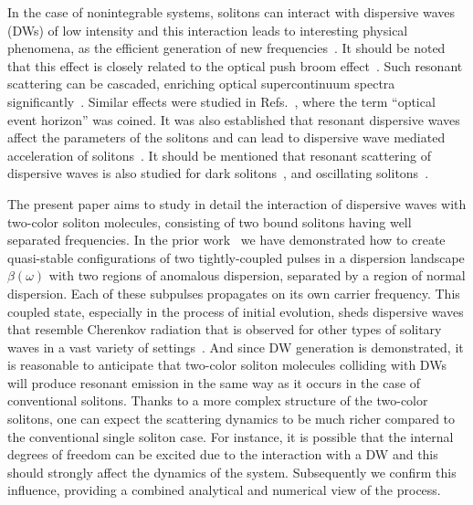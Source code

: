 \documentclass[aps, pra, twocolumn, superscriptaddress, final]{revtex4}
\begin{document}
In the case of nonintegrable systems, solitons can interact with dispersive
waves (DWs) of low intensity and this interaction leads to interesting physical
phenomena, as the efficient generation of new frequencies~\cite{Yulin:04,
PhysRevE.72.016619, Efimov:04, PhysRevLett.95.213902, Efimov:06}.
It should be noted that this effect is closely related to the optical push
broom effect~\cite{deSterke:92}.
Such resonant scattering can be cascaded, enriching optical
supercontinuum spectra significantly~\cite{Gorbach_NatPhoton}.
Similar effects
were studied in Refs.~\cite{PhysRevLett.110.233901,  Demircan_SciRep,
Philbin_Science}, where the term ``optical event horizon'' was coined. It was
also established that resonant dispersive waves affect the parameters of the
solitons and can lead to dispersive wave mediated acceleration of
solitons~\cite{PhysRevE.72.016619, PhysRevLett.106.163901,
PhysRevLett.110.233901, Yulin:13, Demircan:14,  Wang:15, PhysRevA.98.023833}.
It should be mentioned that resonant scattering of dispersive waves is also
studied for dark solitons~\cite{Oreshnikov:15, Marest:18,  Deng:18,
PhysRevA.103.023505}, and oscillating solitons~\cite{Kodama:94,
Conforti_SciRep, Driben:15, PhysRevLett.115.223902, PhysRevLett.116.183901,
PhysRevA.96.013809}.

The present paper aims to study in detail the interaction of dispersive waves
with two-color soliton molecules, consisting of two bound solitons having well separated
frequencies.
%
In the prior work~\cite{PhysRevLett.123.243905} we have demonstrated how to
create quasi-stable configurations of two tightly-coupled pulses in a
dispersion landscape $\beta(\omega)$ with two regions of anomalous dispersion,
separated by a region of normal dispersion. Each of these subpulses propagates
on its own carrier frequency.
%
This coupled state, especially in the process of initial
evolution, sheds dispersive waves that resemble Cherenkov radiation that is
observed for other types of solitary waves in a vast variety of
settings~\cite{akhmediev1995cherenkov, afanasjev1996effect, Driben:15,
Conforti_SciRep, PhysRevLett.115.223902, PhysRevA.96.013809}. And since DW
generation is demonstrated, it is reasonable to anticipate that two-color
soliton molecules colliding with DWs will produce resonant emission in the same
way as it occurs in the case of conventional solitons.
Thanks to a more complex structure of the two-color solitons, one can expect
the scattering dynamics to be much richer compared to the conventional single
soliton case. For instance, it is possible that the internal degrees of freedom
can be excited due to the interaction with a DW and this should
strongly affect the dynamics of the system.
Subsequently we confirm this influence, providing a combined analytical and
numerical view of the process.
\end{document}
